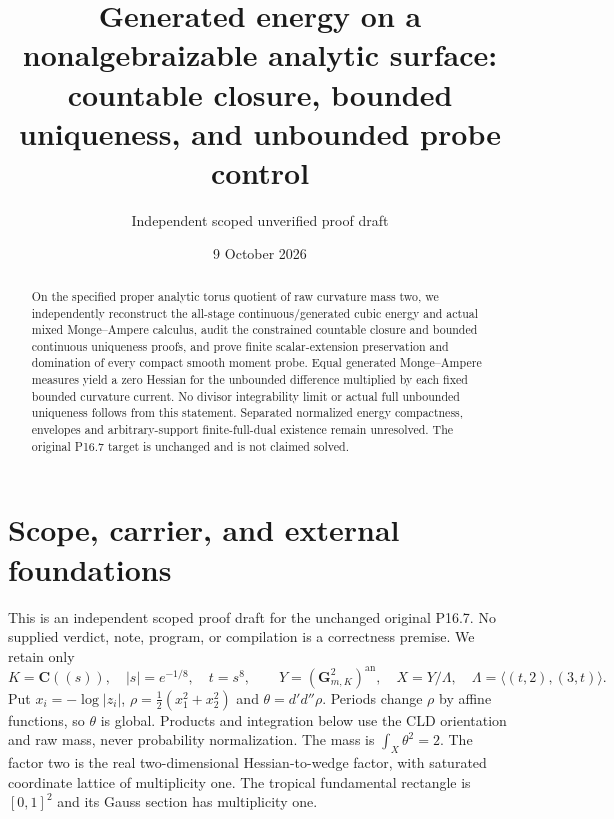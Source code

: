 \documentclass[11pt]{article}
\title{Generated energy on a nonalgebraizable analytic surface:\\
countable closure, bounded uniqueness, and unbounded probe control}
\author{Independent scoped unverified proof draft}
\date{9 October 2026}
\begin{document}
\maketitle
\begin{abstract}
On the specified proper analytic torus quotient of raw curvature mass two,
we independently reconstruct the all-stage continuous/generated cubic energy
and actual mixed Monge--Ampere calculus, audit the constrained countable
closure and bounded continuous uniqueness proofs, and prove finite
scalar-extension preservation and domination of every compact smooth moment
probe. Equal generated Monge--Ampere measures yield a zero Hessian for the
unbounded difference multiplied by each fixed bounded curvature current.
No divisor integrability limit or actual full unbounded uniqueness follows
from this statement. Separated normalized energy compactness, envelopes and
arbitrary-support finite-full-dual existence remain unresolved. The original
P16.7 target is unchanged and is not claimed solved.
\end{abstract}
\section{Scope, carrier, and external foundations}
This is an independent scoped proof draft for the unchanged original P16.7.
No supplied verdict, note, program, or compilation is a correctness premise.
We retain only
\[
 K=\mathbf C((s)),\quad |s|=e^{-1/8},\quad t=s^8,\qquad
 Y=(\mathbf G_{m,K}^{2})^{\mathrm{an}},\quad
 X=Y/\Lambda,\quad \Lambda=\langle(t,2),(3,t)\rangle.
\]
Put $x_i=-\log|z_i|$, $\rho=\frac12(x_1^2+x_2^2)$ and
$\theta=d'd''\rho$. Periods change $\rho$ by affine functions, so $\theta$
is global. Products and integration below use the CLD orientation and raw mass,
never probability normalization. The mass is $\int_X\theta^2=2$.
The factor two is the real two-dimensional Hessian-to-wedge factor, with
saturated coordinate lattice of multiplicity one. The tropical fundamental
rectangle is $[0,1]^2$ and its Gauss section has multiplicity one.
\end{document}

